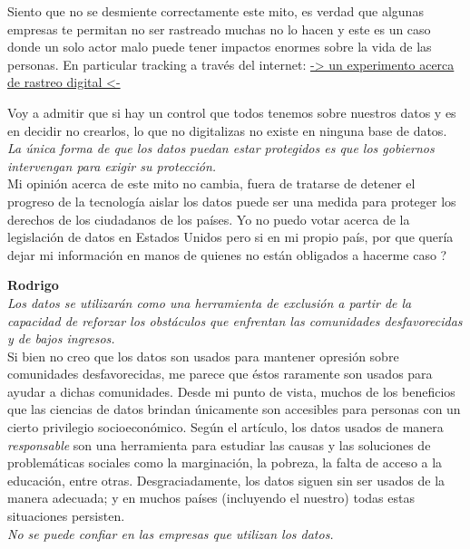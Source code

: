 \documentclass[12pt,a4paper]{article}
\begin{document}
\begin{enumerate}
\begin{enumerate}
				Siento que no se desmiente correctamente este
				mito, es verdad que algunas empresas te permitan
				no ser rastreado muchas no lo hacen y este es
				un caso donde un solo actor malo
				puede tener impactos enormes sobre la vida de
				las personas. En particular tracking
				a través del internet: \href{https://coveryourtracks.eff.org/}{-> un experimento acerca de rastreo digital <-}

				Voy a admitir que si hay un control que todos
				tenemos sobre nuestros datos y es en decidir no
				crearlos, lo que no digitalizas no existe
				en ninguna base de datos.\\

				\textit{La única forma de que los datos puedan estar protegidos es que
				los gobiernos intervengan para exigir su protección.}\\

				Mi opinión acerca de este mito no cambia,
				fuera de tratarse de detener el progreso de la tecnología
				aislar los datos puede ser una medida para proteger los
				derechos de los ciudadanos de los países.
				Yo no puedo votar acerca de la legislación de datos
				en Estados Unidos pero si en mi propio país, por que
				quería dejar mi información en manos de quienes no
				están obligados a hacerme caso ?
				
				\textbf{Rodrigo}\\
				\textit {Los datos se utilizarán como una herramienta de exclusión a 
				partir de la capacidad de reforzar los obstáculos que enfrentan 
				las comunidades desfavorecidas y de bajos ingresos.} \\
				
				Si bien no creo que los datos son usados para mantener opresión sobre 
				comunidades desfavorecidas, me parece que éstos raramente son usados para
				ayudar a dichas comunidades. Desde mi punto de vista, muchos de los beneficios 
				que las ciencias de datos brindan únicamente son accesibles para personas con un 
				cierto privilegio socioeconómico. Según el artículo, los datos usados de manera 
				\textit{responsable} son una herramienta para estudiar las causas y las soluciones 
				de problemáticas sociales como la marginación, la pobreza, la falta de acceso a la educación,
				entre otras. Desgraciadamente, los datos siguen sin ser usados de la manera adecuada; 
				y en muchos países (incluyendo el nuestro) todas estas situaciones persisten. \\
				
				\textit {No se puede confiar en las empresas que utilizan los datos.}\\
				

\end{enumerate}
\end{enumerate}
\end{document}
